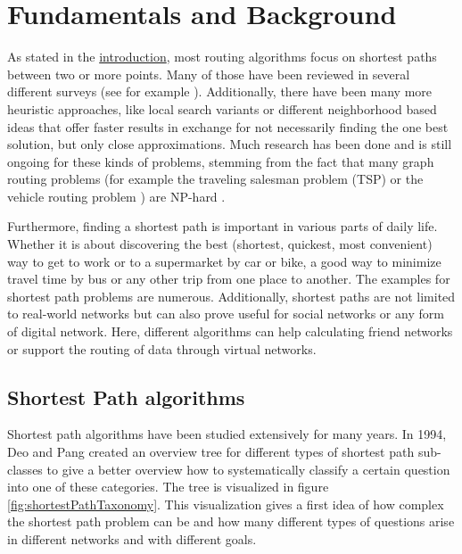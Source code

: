 \chapter{Fundamentals and Background}
\label{chapter:fundamentals}

As stated in the \href{chapter:introduction}{introduction}, most routing algorithms focus on shortest paths between two or more points.
Many of those have been reviewed in several different surveys (see for example \cite{madkour_survey_2017, wayahdi_greedy_2021}).
Additionally, there have been many more heuristic approaches, like local search variants \cite{braysy_vehicle_2005, irnich_sequential_2006, ropke_heuristic_2005} or different neighborhood based ideas \cite{braysy_vehicle_2005, irnich_sequential_2006, ropke_heuristic_2005} that offer faster results in exchange for not necessarily finding the one best solution, but only close approximations.
Much research has been done and is still ongoing for these kinds of problems, stemming from the fact that many graph routing problems (for example the traveling salesman problem (TSP) \cite{gendreau_handbook_2010} or the vehicle routing problem \cite{braysy_vehicle_2005, irnich_sequential_2006}) are NP-hard \cite{reinelt_traveling_2003}.
 
Furthermore, finding a shortest path is important in various parts of daily life.
Whether it is about discovering the best (shortest, quickest, most convenient) way to get to work or to a supermarket by car or bike, a good way to minimize travel time by bus or any other trip from one place to another.
The examples for shortest path problems are numerous.
Additionally, shortest paths are not limited to real-world networks but can also prove useful for social networks or any form of digital network.
Here, different algorithms can help calculating friend networks or support the routing of data through virtual networks. \cite{madkour_survey_2017}

\section{Shortest Path algorithms}
\label{sec:shortestPath}

Shortest path algorithms have been studied extensively for many years.
In 1994, Deo and Pang created an overview tree for different types of shortest path sub-classes to give a better overview how to systematically classify a certain question into one of these categories.
The tree is visualized in figure \ref{fig:shortestPathTaxonomy}.
This visualization gives a first idea of how complex the shortest path problem can be and how many different types of questions arise in different networks and with different goals. \cite{deo_shortest-path_1984}


